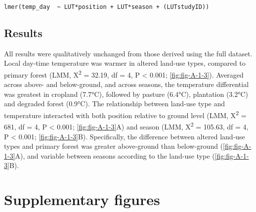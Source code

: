 \documentclass[12pt,a4paper,]{report}
\theoremstyle{definition}
\theoremstyle{definition}
\theoremstyle{definition}
\theoremstyle{remark}
\begin{document}
\texttt{lmer(temp\_day\ \ \textasciitilde{}\ LUT*position\ +\ LUT*season\ +\ (LUT\textbar{}studyID))}

\subsection{Results}\label{results-1}

All results were qualitatively unchanged from those derived using the
full dataset. Local day-time temperature was warmer in altered land-use
types, compared to primary forest (LMM, Χ\textsuperscript{2} = 32.19, df
= 4, P \textless{} 0.001; \autoref{fig:fig-A-1-3}). Averaged across
above- and below-ground, and across seasons, the temperature
differential was greatest in cropland (7.7°C), followed by pasture
(6.4°C), plantation (3.2°C) and degraded forest (0.9°C). The
relationship between land-use type and temperature interacted with both
position relative to ground level (LMM, Χ\textsuperscript{2} = 681, df =
4, P \textless{} 0.001; \autoref{fig:fig-A-1-3}A) and season (LMM,
Χ\textsuperscript{2} = 105.63, df = 4, P \textless{} 0.001;
\autoref{fig:fig-A-1-3}B). Specifically, the difference between altered
land-use types and primary forest was greater above-ground than
below-ground (\autoref{fig:fig-A-1-3}A), and variable between seasons
according to the land-use type (\autoref{fig:fig-A-1-3}B).

\pagebreak

\section{Supplementary figures}\label{supplementary-figures}
\end{document}
